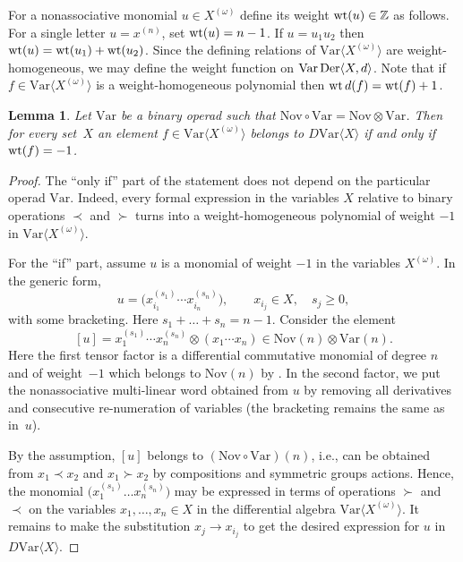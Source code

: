 \documentclass[pdftex]{sigma}
\numberwithin{equation}{section}
\newtheorem{Lemma}[Theorem]{Lemma}
\def\Var{\mathrm{Var}}
\def\Nov{\mathrm{Nov}}
\def\wt {\mathop {\fam 0 wt}\nolimits}
\def\Der {\mathop {\fam 0 Der}\nolimits}
\begin{document}
For a nonassociative monomial $u\in X^{(\omega )}$ define its
weight $\wt(u)\in \mathbb Z$ as follows. For a single letter
$u=x^{(n)}$, set $\wt(u)=n-1$. If $u=u_1u_2$ then
$\wt(u) = \wt(u_1)+\wt(u_2)$.
Since the defining relations of $\Var\bigl\langle X^{(\omega )}\bigr\rangle $
are weight-homogeneous, we may define the weight function
on $\Var\Der\langle X,d\rangle $.
Note that if $f\in \Var\bigl\langle X^{(\omega )}\bigr\rangle $
is a weight-homogeneous polynomial then
$\wt d(f) = \wt(f)+1$.

\begin{Lemma}\label{lem:Weight-criterion}
 Let $\Var $ be a binary operad such that
 $\Nov\circ \Var = \Nov \otimes \Var $.
Then for every set~$X$ an element $f\in \Var\bigl\langle X^{(\omega )}\bigr\rangle $
belongs to $D\Var \langle X\rangle $ if and only if
$\wt (f)=-1$.
\end{Lemma}

\begin{proof}
The ``only if'' part of the statement does not depend on the particular operad $\Var $.
Indeed,
every formal expression in the variables $X$ relative to binary operations $\prec$
and $\succ $ turns into a weight-homogeneous polynomial of weight $-1$ in $\Var\bigl\langle X^{(\omega )}\bigr\rangle $.

For the ``if'' part, assume $u$ is a monomial of weight $-1$ in the variables $X^{(\omega )}$.
In the generic form,
\[
 u = \bigl(x_{i_1}^{(s_1)}\cdots x_{i_n}^{(s_n)}\bigr), \qquad x_{i_j}\in X,\quad s_j\ge 0,
\]
with some bracketing. Here $s_1+\dots +s_n = n-1$.
Consider the element
\[
[u] = x_{1}^{(s_1)}\cdots x_{n}^{(s_n)} \otimes (x_1\cdots x_n) \in \Nov(n)\otimes \Var(n).
\]
Here the first tensor factor is a differential commutative monomial of degree $n$ and of weight~$-1$
which belongs to $\Nov(n)$ by \cite{DzhLofwall2002}. In the second factor, we put the
nonassociative multi-linear word
obtained from $u$ by removing all derivatives and consecutive
re-numeration of variables (the bracketing remains the same as in~$u$).

By the assumption, $[u]$ belongs to $(\Nov\circ \Var)(n)$, i.e., can be obtained
from $x_1\prec x_2$ and $x_1\succ x_2$ by compositions and symmetric groups actions.
Hence,
the monomial $\bigl(x_{1}^{(s_1)}\dots x_{n}^{(s_n)}\bigr)$ may be expressed in terms of
operations $\succ $ and $\prec$ on the variables $x_1,\dots,x_n\in X$
in the differential algebra $\Var\bigl\langle X^{(\omega )}\bigr\rangle $.
It remains to make the substitution
$x_{j}\to x_{i_j}$ to get the desired expression for $u$ in $D\Var \langle X\rangle $.
\end{proof}
\end{document}
